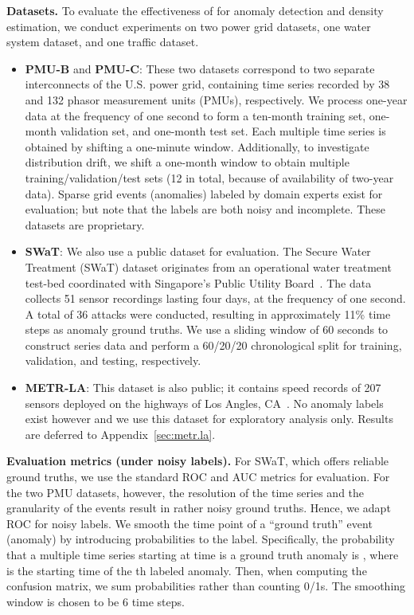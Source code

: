 \textbf{Datasets.}
To evaluate the effectiveness of {\method} for anomaly detection and density estimation, we conduct experiments on two power grid datasets, one water system dataset, and one traffic dataset.
\begin{itemize} [leftmargin=*]
\item \textbf{PMU-B} and \textbf{PMU-C}: These two datasets correspond to two separate interconnects of the U.S. power grid, containing time series recorded by 38 and 132 phasor measurement units (PMUs), respectively. We process one-year data at the frequency of one second to form a ten-month training set, one-month validation set, and one-month test set. Each multiple time series is obtained by shifting a one-minute window. Additionally, to investigate distribution drift, we shift a one-month window to obtain multiple training/validation/test sets (12 in total, because of availability of two-year data). Sparse grid events (anomalies) labeled by domain experts exist for evaluation; but note that the labels are both noisy and incomplete. These datasets are proprietary.

\item \textbf{SWaT}: We also use a public dataset for evaluation. The Secure Water Treatment (SWaT) dataset originates from an operational water treatment test-bed coordinated with Singapore's Public Utility Board~\citep{goh2016dataset}. The data collects 51 sensor recordings lasting four days, at the frequency of one second. A total of 36 attacks were conducted, resulting in approximately 11\% time steps as anomaly ground truths. We use a sliding window of 60 seconds to construct series data and perform a 60/20/20 chronological split for training, validation, and testing, respectively.

\item \textbf{METR-LA}: This dataset is also public; it contains speed records of 207 sensors deployed on the highways of Los Angles, CA~\citep{Li2018}. No anomaly labels exist however and we use this dataset for exploratory analysis only. Results are deferred to Appendix~\ref{sec:metr.la}.
\end{itemize}

\textbf{Evaluation metrics (under noisy labels).} For SWaT, which offers reliable ground truths, we use the standard ROC and AUC metrics for evaluation. For the two PMU datasets, however, the resolution of the time series and the granularity of the events result in rather noisy ground truths. Hence, we adapt ROC for noisy labels. We smooth the time point of a ``ground truth'' event (anomaly) by introducing probabilities to the label. Specifically, the probability that a multiple time series starting at time  is a ground truth anomaly is , where  is the starting time of the th labeled anomaly. Then, when computing the confusion matrix, we sum probabilities rather than counting 0/1s. The smoothing window  is chosen to be 6 time steps.

